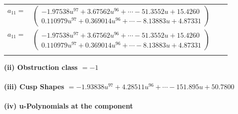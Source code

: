 \documentclass[1p]{elsarticle_modified}
\theoremstyle{definition}
\begin{document}
\begin{tabular}{m{7pt} m{180pt} m{7pt} m{180pt} }
\flushright $a_{11}=$&$\begin{pmatrix}-1.97538 u^{97}+3.67562 u^{96}+\cdots-51.3552 u+15.4260\\0.110979 u^{97}+0.369014 u^{96}+\cdots-8.13883 u+4.87331\end{pmatrix}$\\ \flushright $a_{11}=$&$\begin{pmatrix}-1.97538 u^{97}+3.67562 u^{96}+\cdots-51.3552 u+15.4260\\0.110979 u^{97}+0.369014 u^{96}+\cdots-8.13883 u+4.87331\end{pmatrix}$\\&\end{tabular}
\flushleft \textbf{(ii) Obstruction class $= -1$}\\~\\
\flushleft \textbf{(iii) Cusp Shapes $= -1.93838 u^{97}+4.28511 u^{96}+\cdots-151.895 u+50.7800$}\\~\\
\newpage\renewcommand{\arraystretch}{1}
\flushleft \textbf{(iv) u-Polynomials at the component}\newline \\
\end{document}
